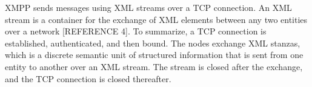 XMPP sends messages using XML streams over a TCP connection. An XML stream is a container for the exchange of XML elements between any two entities over a network [REFERENCE 4]. To summarize, a TCP connection is established, authenticated, and then bound. The nodes exchange XML stanzas, which is a discrete semantic unit of structured information that is sent from one entity to another over an XML stream. The stream is closed after the exchange, and the TCP connection is closed thereafter.
